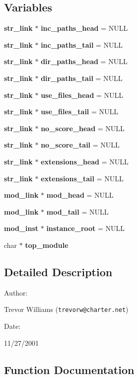 \subsection*{Variables}
\begin{CompactItemize}
\item 
{\bf str\_\-link} $\ast$ {\bf inc\_\-paths\_\-head} = NULL
\item 
{\bf str\_\-link} $\ast$ {\bf inc\_\-paths\_\-tail} = NULL
\item 
{\bf str\_\-link} $\ast$ {\bf dir\_\-paths\_\-head} = NULL
\item 
{\bf str\_\-link} $\ast$ {\bf dir\_\-paths\_\-tail} = NULL
\item 
{\bf str\_\-link} $\ast$ {\bf use\_\-files\_\-head} = NULL
\item 
{\bf str\_\-link} $\ast$ {\bf use\_\-files\_\-tail} = NULL
\item 
{\bf str\_\-link} $\ast$ {\bf no\_\-score\_\-head} = NULL
\item 
{\bf str\_\-link} $\ast$ {\bf no\_\-score\_\-tail} = NULL
\item 
{\bf str\_\-link} $\ast$ {\bf extensions\_\-head} = NULL
\item 
{\bf str\_\-link} $\ast$ {\bf extensions\_\-tail} = NULL
\item 
{\bf mod\_\-link} $\ast$ {\bf mod\_\-head} = NULL
\item 
{\bf mod\_\-link} $\ast$ {\bf mod\_\-tail} = NULL
\item 
{\bf mod\_\-inst} $\ast$ {\bf instance\_\-root} = NULL
\item 
char $\ast$ {\bf top\_\-module}
\end{CompactItemize}


\subsection{Detailed Description}


\begin{Desc}
\item[Author: ]\par
Trevor Williams ({\tt trevorw@charter.net}) \end{Desc}
\begin{Desc}
\item[Date: ]\par
11/27/2001\end{Desc}


\subsection{Function Documentation}
